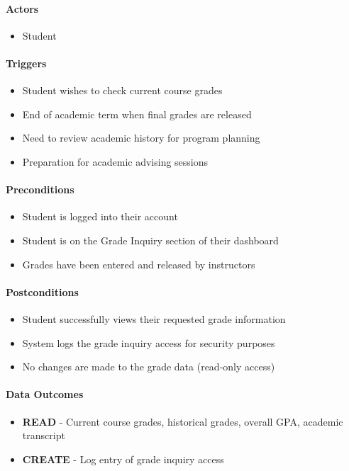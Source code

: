\paragraph{Actors}
\begin{itemize}
    \item Student
\end{itemize}

\paragraph{Triggers}
\begin{itemize}
    \item Student wishes to check current course grades
    \item End of academic term when final grades are released
    \item Need to review academic history for program planning
    \item Preparation for academic advising sessions
\end{itemize}

\paragraph{Preconditions}
\begin{itemize}
    \item Student is logged into their account
    \item Student is on the Grade Inquiry section of their dashboard
    \item Grades have been entered and released by instructors
\end{itemize}

\paragraph{Postconditions}
\begin{itemize}
    \item Student successfully views their requested grade information
    \item System logs the grade inquiry access for security purposes
    \item No changes are made to the grade data (read-only access)
\end{itemize}

\paragraph{Data Outcomes}
\begin{itemize}
    \item \textbf{READ} - Current course grades, historical grades, overall GPA, academic transcript
    \item \textbf{CREATE} - Log entry of grade inquiry access
\end{itemize}

